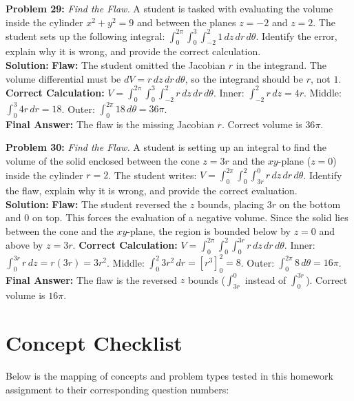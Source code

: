 \documentclass[12pt]{article}
\begin{document}
\textbf{Problem 29:} \textit{Find the Flaw.} A student is tasked with evaluating the volume inside the cylinder $x^2+y^2=9$ and between the planes $z=-2$ and $z=2$. The student sets up the following integral: $\int_0^{2\pi}\int_0^3\int_{-2}^2 1 \,dz\,dr\,d\theta$. Identify the error, explain why it is wrong, and provide the correct calculation.
\\
\textbf{Solution:} \textbf{Flaw:} The student omitted the Jacobian $r$ in the integrand. The volume differential must be $dV = r \, dz \, dr \, d\theta$, so the integrand should be $r$, not $1$.
\textbf{Correct Calculation:} $V = \int_0^{2\pi}\int_0^3\int_{-2}^2 r \,dz\,dr\,d\theta$. Inner: $\int_{-2}^2 r \, dz = 4r$. Middle: $\int_0^3 4r \, dr = 18$. Outer: $\int_0^{2\pi} 18 \, d\theta = 36\pi$.
\\
\textbf{Final Answer:} The flaw is the missing Jacobian $r$. Correct volume is $36\pi$.
\vspace{0.5cm}

\textbf{Problem 30:} \textit{Find the Flaw.} A student is setting up an integral to find the volume of the solid enclosed between the cone $z = 3r$ and the $xy$-plane ($z=0$) inside the cylinder $r=2$. The student writes: $V = \int_0^{2\pi}\int_0^2\int_{3r}^0 r \,dz\,dr\,d\theta$. Identify the flaw, explain why it is wrong, and provide the correct evaluation.
\\
\textbf{Solution:} \textbf{Flaw:} The student reversed the $z$ bounds, placing $3r$ on the bottom and $0$ on top. This forces the evaluation of a negative volume. Since the solid lies between the cone and the $xy$-plane, the region is bounded below by $z=0$ and above by $z=3r$. 
\textbf{Correct Calculation:} $V = \int_0^{2\pi}\int_0^2\int_0^{3r} r \,dz\,dr\,d\theta$. Inner: $\int_0^{3r} r \, dz = r(3r) = 3r^2$. Middle: $\int_0^2 3r^2 \, dr = [r^3]_0^2 = 8$. Outer: $\int_0^{2\pi} 8 \, d\theta = 16\pi$.
\\
\textbf{Final Answer:} The flaw is the reversed $z$ bounds ($\int_{3r}^0$ instead of $\int_0^{3r}$). Correct volume is $16\pi$.
\vspace{1cm}

\pagebreak

\section*{Concept Checklist}
Below is the mapping of concepts and problem types tested in this homework assignment to their corresponding question numbers:
\end{document}
